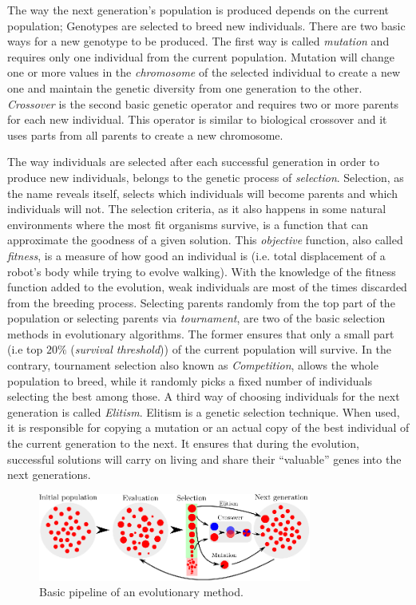 The way the next generation's population is produced depends on the current population; Genotypes are selected to breed new individuals. There are two basic ways for a new genotype to be produced. The first way is called \emph{mutation} and requires only one individual from the current population. Mutation will change one or more values in the \emph{chromosome} of the selected individual to create a new one and maintain the genetic diversity from one generation to the other. \emph{Crossover} is the second basic genetic operator and requires two or more parents for each new individual. This operator is similar to biological crossover and it uses parts from all parents to create a new chromosome. 


The way individuals are selected after each successful generation in order to produce new individuals, belongs to the genetic process of \emph{selection}. Selection, as the name reveals itself, selects which individuals will become parents and which individuals will not. The selection criteria, as it also happens in some natural environments where the most fit organisms survive, is a function that can approximate the goodness of a given solution. This \emph{objective} function, also called \emph{fitness}, is a measure of how good an individual is (i.e. total displacement of a robot's body while trying to evolve walking). With the knowledge of the fitness function added to the evolution, weak individuals are most of the times discarded from the breeding process. Selecting parents randomly from the top part of the population or selecting parents via \emph{tournament}, are two of the basic selection methods in evolutionary algorithms. The former ensures that only a small part (i.e top $20\%$ ({\it survival threshold})) of the current population will survive. In the contrary, tournament selection also known as \emph{Competition}, allows the whole population to breed, while it randomly picks a fixed number of individuals selecting the best among those. A third way of choosing individuals for the next generation is called \emph{Elitism}. Elitism is a genetic selection technique. When used, it is responsible for copying a mutation or an actual copy of the best individual of the current generation to the next. It ensures that during the evolution, successful solutions will carry on living and share their ``valuable'' genes into the next generations.

\begin{figure}[t!]
\vspace{0.4cm} %
\centering
\includegraphics[width=0.8\textwidth]{../Figures/Misc/Evolution.eps}
\caption{Basic pipeline of an evolutionary method.}
\label{fig:evolutionPipeline}
\end{figure}


